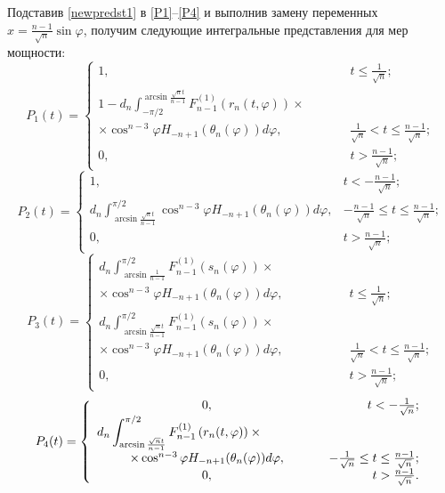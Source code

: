 Подставив  \eqref{newpredst1} в \eqref{P1}--\eqref{P4} и выполнив замену переменных $x=\frac{n-1}{\sqrt{n}}\sin\varphi$,  получим следующие интегральные представления для мер мощности:
\begin{equation}\label{P1new}
P_1(t)= \left\{
\begin{array}{cr}
1, &t\le\frac{1}{\sqrt{n}};\\
\displaystyle
1-d_n\int_{-\pi/2}^{\arcsin\frac{\sqrt{n}t}{n-1}}
F_{n-1}^{(1)}\left(r_n(t,\varphi)\right) \times  \hspace{1cm} \phantom{;}  & \\ \times \cos^{n-3}\varphi H_{-n+1}(\theta_n(\varphi)) d\varphi,
&
\frac{1}{\sqrt{n}}<t\le\frac{n-1}{\sqrt{n}};\\
0,&t>\frac{n-1}{\sqrt{n}};
\end{array}
\right.
\end{equation}
\begin{equation}\label{P4new}
P_2(t)=
 \left\{
 \begin{array}{cr}
 1, &t<-\frac{n-1}{\sqrt{n}};\\
 \displaystyle
d_n\int_{\arcsin\frac{\sqrt{n}t}{n-1}}^{\pi/2}
\cos^{n-3}\varphi H_{-n+1}(\theta_n(\varphi)) d\varphi,
&-\frac{n-1}{\sqrt{n}}\le t\le \frac{n-1}{\sqrt{n}};\\
 0, &t>\frac{n-1}{\sqrt{n}};
 \end{array}
 \right.
 \end{equation}
\begin{equation}\label{P4new}
P_3(t)=
\left\{
\begin{array}{cr}
\displaystyle d_n\int_{\arcsin\frac{1}{n-1}}^{\pi/2}
F_{n-1}^{(1)}\left(s_n(\varphi)\right) \times \hspace{2cm} \phantom{;} \\  \times \cos^{n-3}\varphi H_{-n+1}(\theta_n(\varphi)) d\varphi, &
t\le\frac{1}{\sqrt{n}};\\
\displaystyle 
d_n\int_{\arcsin\frac{\sqrt{n}t}{n-1}}^{\pi/2}
F_{n-1}^{(1)}\left(s_n(\varphi)\right) \times \hspace{2cm} \phantom{;}\\  \times\cos^{n-3}\varphi H_{-n+1}(\theta_n(\varphi)) d\varphi, &
\frac{1}{\sqrt{n}}<t\le\frac{n-1}{\sqrt{n}};\\
0, &t>\frac{n-1}{\sqrt{n}};
\end{array}
\right.
\end{equation}
\begin{equation}\label{P4new}
P_4(t)=\left\{
\begin{array}{cr}
0, &t<-\frac{1}{\sqrt{n}};\\
\displaystyle
d_n\int_{\arcsin\frac{\sqrt{n}t}{n-1}}^{\pi/2}
F_{n-1}^{(1)}\left(r_n(t,\varphi)\right)  \times \hspace{1.4cm} \phantom{;}\\  \times\cos^{n-3}\varphi H_{-n+1}(\theta_n(\varphi)) d\varphi, &
-\frac{1}{\sqrt{n}}\le t \le\frac{n-1}{\sqrt{n}};\\
0,&t>\frac{n-1}{\sqrt{n}}.
\end{array}
\right.
\end{equation}
